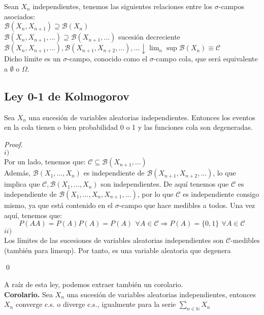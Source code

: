 Sean ${X_n}$ independientes, tenemos las siguientes relaciones entre los $\sigma$-campos asociados:\\

$\mathcal{B}(X_n, X_{n+1}) \supseteq \mathcal{B}(X_n)$\\
$\mathcal{B}(X_n, X_{n+1}, ...) \supseteq \mathcal{B}(X_{n+1}, ...)$ sucesión decreciente\\
$\mathcal{B}(X_n, X_{n+1}, ...), \mathcal{B}(X_{n+1}, X_{n+2}, ...), ... \downarrow \lim_n \sup \mathcal{B}(X_n) \equiv \mathcal{C}$\\

Dicho límite es un $\sigma$-campo, conocido como el $\sigma$-campo cola, que será equivalente a $\emptyset$ o $\Omega$.

\subsection{Ley 0-1 de Kolmogorov}
Sea $X_n$ una sucesión de variables aleatorias independientes. Entonces los eventos en la cola tienen o bien probabilidad 0 o 1 y las funciones cola son degeneradas.
\begin{proof}$\,$\\
$i)$\\
Por un lado, tenemos que: $\mathcal{C} \subseteq \mathcal{B}(X_{n+1}, ...)$\\
Además, $\mathcal{B} (X_1, ..., X_n)$ es independiente de $\mathcal{B}(X_{n+1}, X_{n+2},...)$, lo que implica que $\mathcal{C}, \mathcal{B}(X_1,...,X_n)$ son independientes. De aquí tenemos que $\mathcal{C}$ es independiente de $\mathcal{B}(X_1,...,X_n,X_{n+1},...)$, por lo que $\mathcal{C}$ es independiente consigo mismo, ya que está contenido en el $\sigma$-campo que hace medibles a todos. Una vez aquí, tenemos que:
$$ P(AA) = P(A)P(A) = P(A)\, \ \forall A \in \mathcal{C} \Rightarrow P(A) = \{0,1\}\,\ \forall A \in \mathcal{C}$$
$ii)$\\
Los límites de las sucesiones de variables aleatorias independientes son $\mathcal{C}$-medibles (también para limsup). Por tanto, es una variable aleatoria que degenera

\qed
\end{proof}

A raíz de esta ley, podemos extraer también un corolario.\\

\textbf{Corolario. }Sea $X_n$ una sucesión de variables aleatorias independientes, entonces $X_n$ converge c.s. o diverge c.s., igualmente para la serie $\sum_{n\in\mathbb{N}} X_n$


